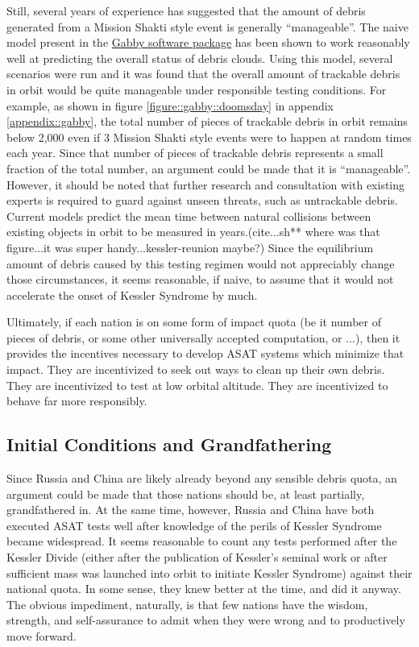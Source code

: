 Still, several years of experience has suggested that the amount of
debris generated from a Mission Shakti style event is generally
``manageable''.  The naive model present in the
\href{https://github.com/harrison-caudill/gabby}{Gabby software
  package} has been shown to work reasonably well at predicting the
overall status of debris clouds.\cite{gabby} Using this model, several
scenarios were run and it was found that the overall amount of
trackable debris in orbit would be quite manageable under responsible
testing conditions.  For example, as shown in figure
\ref{figure::gabby::doomsday} in appendix \ref{appendix::gabby}, the
total number of pieces of trackable debris in orbit remains below
2,000 even if 3 Mission Shakti style events were to happen at random
times each year.  Since that number of pieces of trackable debris
represents a small fraction of the total number, an argument could be
made that it is ``manageable''.  However, it should be noted that
further research and consultation with existing experts is required to
guard against unseen threats, such as untrackable debris.  Current
models predict the mean time between natural collisions between
existing objects in orbit to be measured in years.(cite...sh** where
was that figure...it was super handy...kessler-reunion maybe?)  Since
the equilibrium amount of debris caused by this testing regimen would
not appreciably change those circumstances, it seems reasonable, if
naive, to assume that it would not accelerate the onset of Kessler
Syndrome by much.

Ultimately, if each nation is on some form of impact quota (be it
number of pieces of debris, or some other universally accepted
computation, or ...), then it provides the incentives necessary to
develop ASAT systems which minimize that impact.  They are
incentivized to seek out ways to clean up their own debris.  They are
incentivized to test at low orbital altitude.  They are incentivized
to behave far more responsibly.

\subsection{Initial Conditions and Grandfathering}
Since Russia and China are likely already beyond any sensible debris
quota, an argument could be made that those nations should be, at
least partially, grandfathered in.  At the same time, however, Russia
and China have both executed ASAT tests well after knowledge of the
perils of Kessler Syndrome became widespread.  It seems reasonable to
count any tests performed after the Kessler Divide (either after the
publication of Kessler's seminal work or after sufficient mass was
launched into orbit to initiate Kessler Syndrome) against their
national quota.  In some sense, they knew better at the time, and did
it anyway.  The obvious impediment, naturally, is that few nations
have the wisdom, strength, and self-assurance to admit when they were
wrong and to productively move forward.

